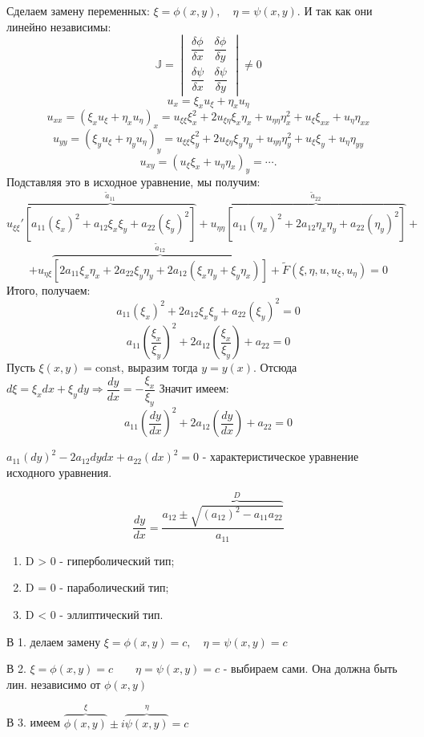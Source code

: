 Сделаем замену переменных: $ \xi = \phi (x, y), \quad \eta = \psi (x, y) $. И так как они линейно независимы:
$$ \mathbb{J} = \begin{vmatrix}
        \dfrac{\delta \phi}{\delta x} & \dfrac{\delta \phi}{\delta y} \\
        \dfrac{\delta \psi}{\delta x} & \dfrac{\delta \psi}{\delta y}
    \end{vmatrix} \neq 0 $$
$$ u_x = \xi_x u_\xi + \eta_x u_\eta $$
$$ u_{xx} = (\xi_x u_\xi + \eta_x u_\eta)_x = u_{\xi \xi} \xi^2_x + 2u_{\xi \eta} \xi_x \eta_x + u_{\eta \eta} \eta^2_x + u_\xi \xi_{xx} + u_\eta \eta_{xx} $$
$$ u_{yy} = (\xi_y u_\xi + \eta_y u_\eta)_y = u_{\xi \xi} \xi^2_y + 2u_{\xi \eta} \xi_y \eta_y + u_{\eta \eta} \eta^2_y + u_\xi \xi_{y} + u_\eta \eta_{yy} $$
$$ u_{xy} = (u_\xi \xi_x + u_\eta \eta_x)_y = \cdots. $$
Подставляя это в исходное уравнение, мы получим:
$$ u_{\xi \xi}' \overbrace{[a_{11}(\xi_x)^2 + a_{12} \xi_x \xi_y + a_{22} (\xi_y)^2]}^{\tilde{a}_{11}} + u_{\eta \eta} \overbrace{[a_{11} (\eta_x)^2 + 2 a_{12} \eta_x \eta_y + a_{22} (\eta_y)^2]}^{\tilde{a}_{22}} + $$
$$ + u_{\eta \xi} \overbrace{[2 a_{11} \xi_x \eta_x + 2 a_{22} \xi_y \eta_y + 2a_{12} ( \xi_x \eta_y + \xi_y \eta_x )]}^{\tilde{a}_{12}} + \tilde{F} (\xi, \eta, u, u_\xi, u_\eta) = 0 $$
Итого, получаем:
$$ a_{11} (\xi_x)^2 + 2 a_{12} \xi_x \xi_y + a_{22} (\xi_y)^2 = 0 $$
$$ a_{11} \left(\dfrac{\xi_x}{\xi_y}\right)^2 + 2 a_{12} \left(\dfrac{\xi_x}{\xi_y}\right) + a_{22} = 0 $$
Пусть $ \xi(x, y) = \text{const} $, выразим тогда $ y = y(x) $. Отсюда $ d\xi = \xi_x dx + \xi_y dy \Rightarrow \dfrac{dy}{dx} = -\dfrac{\xi_x}{\xi_y} $
Значит имеем:
$$ a_{11} \left(\dfrac{dy}{dx}\right)^2 + 2a_{12} \left(\dfrac{dy}{dx}\right) + a_{22} = 0 $$
\begin{definition}
    $a_{11} (dy)^2 - 2 a_{12} dy dx + a_{22} (dx)^2 = 0$ - характеристическое уравнение исходного уравнения. 
\end{definition}
$$ \dfrac{dy}{dx} = \dfrac{a_{12} \pm \overbrace{\sqrt{(a_{12})^2 - a_{11} a_{22}}}^{D}}{a_{11}} $$
\begin{enumerate}
    \item D > 0 - гиперболический тип;
    \item D = 0 - параболический тип;
    \item D < 0 - эллиптический тип.
\end{enumerate}
В 1. делаем замену $ \xi = \phi (x, y) = c, \quad \eta = \psi (x, y) = c $ \par
В 2. $\xi = \phi (x, y) = c \quad \quad \eta = \psi (x, y) = c$ - выбираем сами. Она должна быть лин. независимо от $\phi (x, y)$ \par
В 3. имеем $ \overbrace{\phi (x, y)}^{\xi} \pm i \overbrace{\psi (x, y)}^{\eta} = c $

